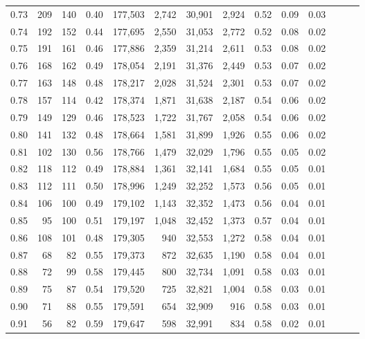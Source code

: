 \begin{tabular}{rrrrrrrrrrrrrr}
0.73 &    209 &  140 &  0.40 &  177,503 &    2,742 &  30,901 &   2,924 &  0.52 &  0.09 &      0.03 \\
0.74 &    192 &  152 &  0.44 &  177,695 &    2,550 &  31,053 &   2,772 &  0.52 &  0.08 &      0.02 \\
0.75 &    191 &  161 &  0.46 &  177,886 &    2,359 &  31,214 &   2,611 &  0.53 &  0.08 &      0.02 \\
0.76 &    168 &  162 &  0.49 &  178,054 &    2,191 &  31,376 &   2,449 &  0.53 &  0.07 &      0.02 \\
0.77 &    163 &  148 &  0.48 &  178,217 &    2,028 &  31,524 &   2,301 &  0.53 &  0.07 &      0.02 \\
0.78 &    157 &  114 &  0.42 &  178,374 &    1,871 &  31,638 &   2,187 &  0.54 &  0.06 &      0.02 \\
0.79 &    149 &  129 &  0.46 &  178,523 &    1,722 &  31,767 &   2,058 &  0.54 &  0.06 &      0.02 \\
0.80 &    141 &  132 &  0.48 &  178,664 &    1,581 &  31,899 &   1,926 &  0.55 &  0.06 &      0.02 \\
0.81 &    102 &  130 &  0.56 &  178,766 &    1,479 &  32,029 &   1,796 &  0.55 &  0.05 &      0.02 \\
0.82 &    118 &  112 &  0.49 &  178,884 &    1,361 &  32,141 &   1,684 &  0.55 &  0.05 &      0.01 \\
0.83 &    112 &  111 &  0.50 &  178,996 &    1,249 &  32,252 &   1,573 &  0.56 &  0.05 &      0.01 \\
0.84 &    106 &  100 &  0.49 &  179,102 &    1,143 &  32,352 &   1,473 &  0.56 &  0.04 &      0.01 \\
0.85 &     95 &  100 &  0.51 &  179,197 &    1,048 &  32,452 &   1,373 &  0.57 &  0.04 &      0.01 \\
0.86 &    108 &  101 &  0.48 &  179,305 &      940 &  32,553 &   1,272 &  0.58 &  0.04 &      0.01 \\
0.87 &     68 &   82 &  0.55 &  179,373 &      872 &  32,635 &   1,190 &  0.58 &  0.04 &      0.01 \\
0.88 &     72 &   99 &  0.58 &  179,445 &      800 &  32,734 &   1,091 &  0.58 &  0.03 &      0.01 \\
0.89 &     75 &   87 &  0.54 &  179,520 &      725 &  32,821 &   1,004 &  0.58 &  0.03 &      0.01 \\
0.90 &     71 &   88 &  0.55 &  179,591 &      654 &  32,909 &     916 &  0.58 &  0.03 &      0.01 \\
0.91 &     56 &   82 &  0.59 &  179,647 &      598 &  32,991 &     834 &  0.58 &  0.02 &      0.01 \\

\end{tabular}
